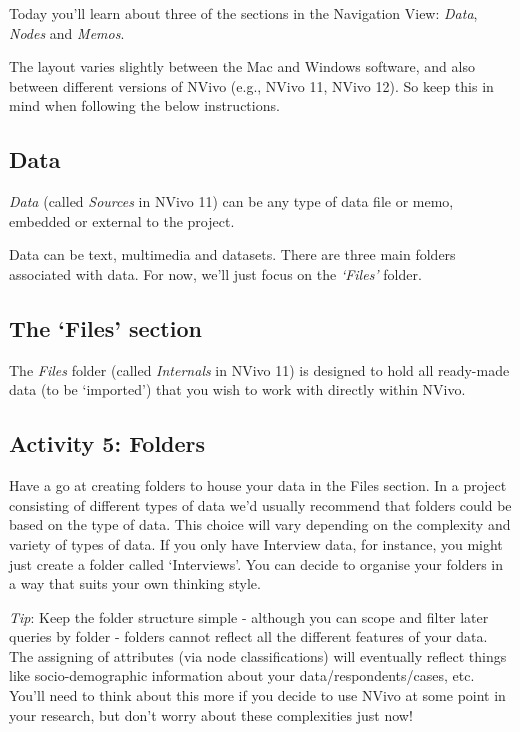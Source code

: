 \documentclass[
]{book}
\begin{document}
Today you'll learn about three of the sections in the Navigation View: \emph{Data}, \emph{Nodes} and \emph{Memos}.

The layout varies slightly between the Mac and Windows software, and also between different versions of NVivo (e.g., NVivo 11, NVivo 12). So keep this in mind when following the below instructions.

\hypertarget{data}{%
\subsection{Data}\label{data}}

\emph{Data} (called \emph{Sources} in NVivo 11) can be any type of data file or memo, embedded or external to the project.

Data can be text, multimedia and datasets. There are three main folders associated with data. For now, we'll just focus on the \emph{`Files'} folder.

\hypertarget{the-files-section}{%
\subsection{The `Files' section}\label{the-files-section}}

The \emph{Files} folder (called \emph{Internals} in NVivo 11) is designed to hold all ready-made data (to be `imported') that you wish to work with directly within NVivo.

\hypertarget{activity-5-folders}{%
\subsection{Activity 5: Folders}\label{activity-5-folders}}

Have a go at creating folders to house your data in the Files section. In a project consisting of different types of data we'd usually recommend that folders could be based on the type of data. This choice will vary depending on the complexity and variety of types of data. If you only have Interview data, for instance, you might just create a folder called `Interviews'. You can decide to organise your folders in a way that suits your own thinking style.

\emph{Tip}: Keep the folder structure simple - although you can scope and filter later queries by folder - folders cannot reflect all the different features of your data. The assigning of attributes (via node classifications) will eventually reflect things like socio-demographic information about your data/respondents/cases, etc. You'll need to think about this more if you decide to use NVivo at some point in your research, but don't worry about these complexities just now!
\end{document}
